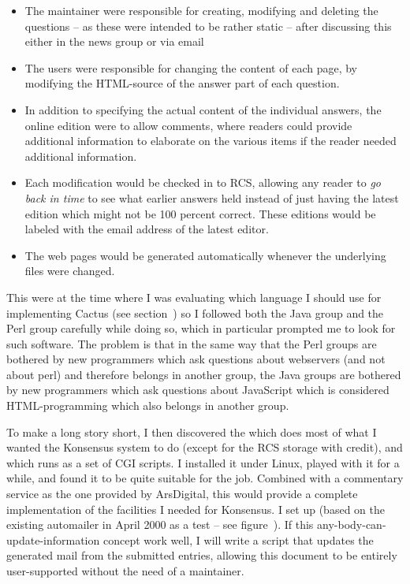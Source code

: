 \begin{itemize}
\item The maintainer were responsible for creating, modifying and
  deleting the questions -- as these were intended to be rather static
  -- after discussing this either in the news group or via email
\item The users were responsible for changing the content of each
  page, by modifying the HTML-source of the answer part of each
  question.

\item In addition to specifying the actual content of the individual
  answers, the online edition were to allow comments, where readers
  could provide additional information to elaborate on the various
  items if the reader needed additional information.
  
\item Each modification would be checked in to RCS, allowing any
  reader to \textit{go back in time} to see what earlier answers held
  instead of just having the latest edition which might not be 100
  percent correct.  These editions would be labeled with the email
  address of the latest editor.
  
\item The web pages would be generated automatically whenever the
  underlying files were changed.
  
\end{itemize}

This were at the time where I was evaluating which language I should
use for implementing Cactus (see section~) so I
followed both the Java group and the Perl group carefully while doing
so, which in particular prompted me to look for such software.  The
problem is that in the same way that the Perl groups are bothered by
new programmers which ask questions about webservers (and not about
perl) and therefore belongs in another group, the Java groups are
bothered by new programmers which ask questions about JavaScript which
is considered HTML-programming which also belongs in another group.


To make a long story short, I then discovered the
which does most of what I wanted the Konsensus system to do (except
for the RCS storage with credit), and which runs as a set of CGI
scripts.  I installed it under Linux, played with it for a while, and
found it to be quite suitable for the job.  Combined with a commentary
service as the one provided by ArsDigital, this would provide a
complete implementation of the facilities I needed for Konsensus.  I
set up  (based on the existing
automailer in April 2000 as a test -- see
figure~).  If this
any-body-can-update-information concept work well, I will write a
script that updates the generated mail from the submitted entries,
allowing this document to be entirely user-supported without the need
of a maintainer.

  

